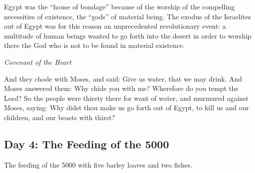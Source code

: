 \begin{quotationx}
Egypt was the “house of bondage” because of the worship of the compelling necessities of existence, the “gods” of
material being. The exodus of the Israelites out of Egypt was for this reason an unprecedented revolutionary event: a
multitude of human beings wanted to go forth into the desert in order to worship there the God who is not to be found
in material existence. \begin{flushright} \emph{Covenant of the Heart}\end{flushright}


And they chode with Moses, and said: Give us water, that we may drink. And Moses answered them: Why chide you with me?
Wherefore do you tempt the Lord? So the people were thirsty there for want of water, and murmured against Moses,
saying: Why didst thou make us go forth out of Egypt, to kill us and our children, and our beasts with thirst? 

\end{quotationx}

\subsection*{Day 4: The Feeding of the 5000}
The feeding of the 5000 with five barley loaves and two fishes.

